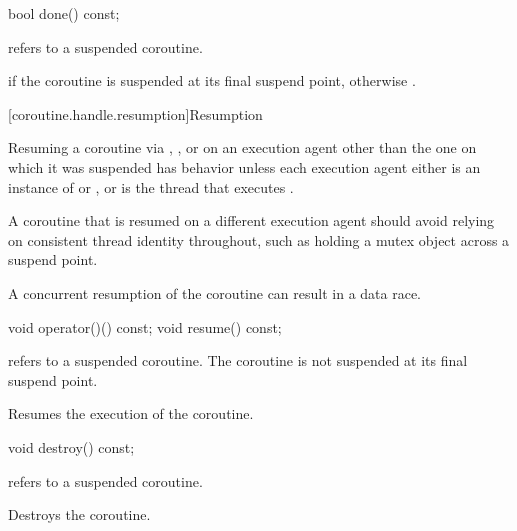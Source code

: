 %
\begin{itemdecl}
bool done() const;
\end{itemdecl}

\begin{itemdescr}
\pnum
\expects
{} refers to a suspended coroutine.

\pnum
\returns
{} if the coroutine is suspended at its
final suspend point, otherwise .
\end{itemdescr}

[coroutine.handle.resumption]{Resumption}

\pnum
Resuming a coroutine via , , or 
on an execution agent other than the one on which it was suspended
has  behavior
unless
each execution agent either is
an instance of  or ,
or is the thread that executes .
\begin{note}
A coroutine that is resumed on a different execution agent should
avoid relying on consistent thread identity throughout, such as holding
a mutex object across a suspend point.
\end{note}
\begin{note}
A concurrent resumption of the coroutine can result in a data race.
\end{note}

%
%
\begin{itemdecl}
void operator()() const;
void resume() const;
\end{itemdecl}

\begin{itemdescr}
\pnum
\expects
{} refers to a suspended coroutine.
The coroutine is not suspended at its final suspend point.

\pnum
\effects
Resumes the execution of the coroutine.
\end{itemdescr}

%
\begin{itemdecl}
void destroy() const;
\end{itemdecl}

\begin{itemdescr}
\pnum
\expects
{} refers to a suspended coroutine.

\pnum
\effects
Destroys the coroutine.
\end{itemdescr}

